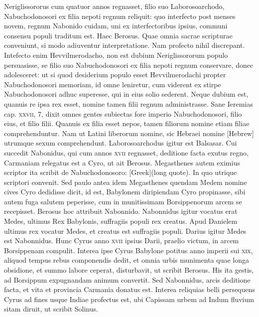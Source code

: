 Neriglissororus cum quatuor annos regnasset,
filio suo Laborosoarchodo, Nabuchodonosori ex filia nepoti
regnum reliquit: quo interfecto post menses novem, regnum Nabonido
cuidam, uni ex interfectoribus ipsius, communi consensu
populi traditum est.
Haec Berosus.
Quae omnia sacrae scripturae conveniunt,
si modo adiuventur interpretatione.
Nam profecto nihil
discrepant.
Intefecto enim Hevvilmerodacho, non est dubium
Neriglissororum populo persuasisse, se filio suo Nabuchodonosori
ex filia nepoti regnum conservare, donec adolesceret: ut si quod
desiderium populo esset Hevvilmerodachi propter Nabuchodonosori
memoriam, id omne leniretur, cum viderent ex stirpe Nabuchodonosori
adhuc superesse, qui in eius solio sederent.
Neque dubium est, quanuis re ipsa rex esset, nomine tamen filii regnum
administrasse.
Sane Ieremias cap. \textsc{xxvii}, 7, dixit omnes gentes subiectas
fore imperio Nabuchodonosori, filio eius, et filio filii.
Quanuis ex filia esset nepos, tamen filiorum nomine etiam filiae
 comprehenduntur.
Nam ut Latini liberorum nomine, sic Hebraei nomine
\texthebrew{[Hebrew]} utrumque sexum comprehendunt.
Laborosoarchodus igitur
est Balsasar.
Cui succedit Nabonidus, qui cum annos \textsc{xvii} regnasset,
deditione facta exutus regno, Carmaniam relegatus est a Cyro,
ut ait Berosus.
Megasthenes autem eximius scriptor ita scribit de
Nabuchodonosoro: \textgreek{[Greek](long quote)}.
In
quo utrique scriptori convenit.
Sed paulo antea idem Megasthenes
quendam Medem nomine cives Cyro dedidisse dicit, id est, Babylonem
diripiendam Cyro propinasse, sibi autem fuga salutem peperisse,
cum in munitissimam Borsippenorum arcem se recepisset.
Berosus hoc attribuit Nabonnido.
Nabonnidus igitur vocatus erat
Medes, ultimus Rex Babylonis, suffragiis populi rex creatus.
Apud
Danielem ultimus rex vocatur Medes, et creatus est suffragiis populi.
Darius igitur Medes est Nabonnidus.
Hunc Cyrus anno \textsc{xvii}
ipsius Darii, praelio victum, in arcem Borsippenam compulit.
Interea ipse Cyrus Babylone potitus anno imperii sui \textsc{xix}, aliquod
tempus rebus componendis dedit, et omnia urbis munimenta
quae longa obsidione, et summo labore ceperat, disturbavit, ut
scribit Berosus.
His ita gestis, ad Borsippum expugnandam animum
convertit.
Sed Nabonnidus, arcis deditione facta, et vita
et provincia Carmania donatus est.
{}
Interea reliquias belli persequens
Cyrus ad fines usque Indiae profectus est, ubi Capissam urbem
ad Indum fluvium sitam diruit, ut scribit Solinus.

